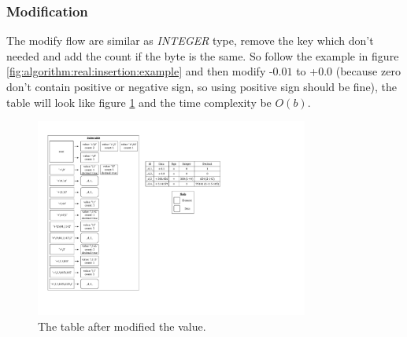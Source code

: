 \subsubsection{Modification}

The modify flow are similar as \textit{INTEGER} type, remove the key which don't needed and add the count if the byte is the same. So follow the example in figure \ref{fig:algorithm:real:insertion:example} and then modify -$0.01$ to +$0.0$ (because zero don't contain positive or negative sign, so using positive sign should be fine), the table will look like figure \ref{fig:algorithm:real:modification:example} and the time complexity be $O(b)$.

\begin{figure}[h]
\centering
\includegraphics[width=0.8\textwidth]{./algorithm/real/pic/modification/example_v4.pdf}
\caption{The table after modified the value.}
\label{fig:algorithm:real:modification:example}
\end{figure}

